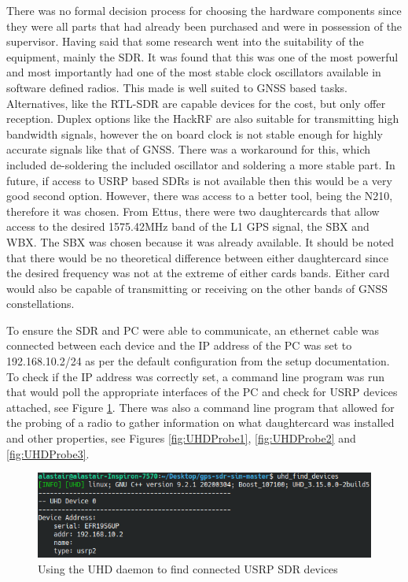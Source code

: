 There was no formal decision process for choosing the hardware components since they were all parts that had already been purchased and were in possession of the
supervisor. Having said that some research went into the suitability of the equipment, mainly the SDR. It was found that this was one of the most powerful and most
importantly had one of the most stable clock oscillators available in software defined radios. This made is well suited to GNSS based tasks. Alternatives, like the
RTL-SDR are capable devices for the cost, but only offer reception. Duplex options like the HackRF are also suitable for transmitting high bandwidth signals, however the
on board clock is not stable enough for highly accurate signals like that of GNSS. There was a workaround for this, which included de-soldering the included oscillator and
soldering a more stable part. In future, if access to USRP based SDRs is not available then this would be a very good second option. However, there was access to a better
tool, being the N210, therefore it was chosen. From Ettus, there were two daughtercards that allow access to the desired 1575.42MHz band of the L1 GPS signal, the SBX and
WBX. The SBX was chosen because it was already available. It should be noted that there would be no theoretical difference between either daughtercard since the desired
frequency was not at the extreme of either cards bands. Either card would also be capable of transmitting or receiving on the other bands of GNSS constellations.

To ensure the SDR and PC were able to communicate, an ethernet cable was connected between each device and the IP address of the PC was set to 192.168.10.2/24 as per the
default configuration from the setup documentation. To check if the IP address was correctly set, a command line program was run that would poll the appropriate
interfaces of the PC and check for USRP devices attached, see Figure \ref{fig:UHDFind}. There was also a command line program that allowed for the probing of a
radio to gather information on what daughtercard was installed and other properties, see Figures \ref{fig:UHDProbe1}, \ref{fig:UHDProbe2} and \ref{fig:UHDProbe3}.

\begin{figure}[!h]
    \begin{centering}
        \includegraphics[width=14cm,keepaspectratio]{Figures/uhd-find-devices.png}
        \caption{Using the UHD daemon to find connected USRP SDR devices}
    \label{fig:UHDFind}
    \end{centering}
\end{figure}


